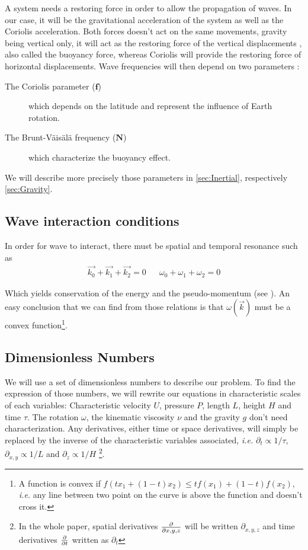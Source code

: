 A system needs a restoring force in order to allow the propagation of waves. In our case, it will be the gravitational acceleration of the system as well as the Coriolis acceleration. Both forces doesn't act on the same movements, gravity being vertical only, it will act as the restoring force of the vertical displacements	, also called the buoyancy force, whereas Coriolis will provide the restoring force of horizontal displacements. Wave frequencies will then depend on two parameters :
\begin{description}
	\item[The Coriolis parameter ($\mathbf{f}$)] which depends on the latitude and represent the influence of Earth rotation.
	\item[The Brunt-Väisälä frequency ($\mathbf{N}$)] which characterize the buoyancy effect.
\end{description}
We will describe more precisely those parameters in \cref{sec:Inertial}, respectively \cref{sec:Gravity}. 

\subsection{Wave interaction conditions}
In order for wave to interact, there must be spatial and temporal resonance such as 
\begin{align*}
	\vec{k_0} + \vec{k_1} + \vec{k_2} = 0 && \omega_0 + \omega_1 + \omega_2 = 0
\end{align*}

Which yields conservation of the energy and the pseudo-momentum (see \cite{staquet_internal_2002}). An easy conclusion that we can find from those relations is that $\omega(\vec{k})$ must be a convex function\footnote{A function is convex if $f(tx_1 + (1-t)x_2) \leq t f(x_1) + (1-t) f(x_2)$, \textit{i.e.} any line between two point on the curve is above the function and doesn't cross it.}.

\subsection{Dimensionless Numbers}

We will use a set of dimensionless numbers to describe our problem. To find the expression of those numbers, we will rewrite our equations in characteristic scales of each variables: Characteristic velocity $U$, pressure $P$, length $L$, height $H$ and time $\tau$. The rotation $\omega$, the kinematic viscosity $\nu$ and the gravity $g$ don't need characterization. Any derivatives, either time or space derivatives, will simply be replaced by the inverse of the characteristic variables associated, \textit{i.e.} $\partial_t \propto 1/\tau$, $\partial_{x,y} \propto 1/L$ and $\partial_z \propto 1/H$ \footnote{In the whole paper, spatial derivatives $\frac{\partial }{\partial x,y,z}$ will be written $\partial_{x,y,z}$ and time derivatives $\frac{\partial }{\partial t}$ written as $\partial_t$}. 

